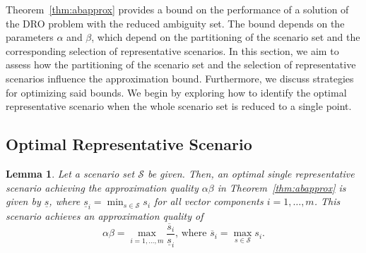 \documentclass{article}
\newtheorem{lemma}[theorem]{Lemma}
\newcommand{\mS}{\mathcal{S}}
\begin{document}
Theorem~\ref{thm:abapprox} provides a bound on the performance of a solution of the DRO problem with the reduced ambiguity set. 
The bound depends on the parameters \(\alpha\) and \(\beta\), which depend on the partitioning of the scenario set and the corresponding selection of representative scenarios. 
In this section, we aim to assess how the partitioning of the scenario set and the selection of representative scenarios influence the approximation bound.
Furthermore, we discuss strategies for optimizing said bounds.
We begin by exploring how to identify the optimal representative scenario when the whole scenario set is reduced to a single point.

\subsection{Optimal Representative Scenario}
\label{sec:optimal_representative}
\begin{lemma}
\label{lem:single_scenario}
Let a scenario set \(\mS\) be given.
Then, an optimal single representative scenario achieving the approximation quality \(\alpha \beta\) in Theorem~\ref{thm:abapprox} is given by
\(\underline{s}\), where \(\underline{s}_i = \min_{s \in \mS}
s_i\) for all vector components $i=1,\ldots,m$. %
This scenario achieves an approximation quality of 
\[
	\alpha \beta = \max_{i=1,\dots,m}\frac{\overline{s}_i}{\underline{s}_i} \text{, where } \overline{s}_i = \max_{s \in \mS} s_i.
\]
\end{lemma}
\end{document}
